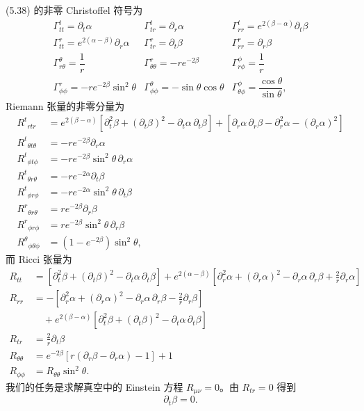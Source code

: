 (5.38) 的非零 Christoffel 符号为
\begin{equation*}
\begin{array}{lll}
\Gamma^t_{tt} = \partial_t\alpha & \Gamma^t_{tr} = \partial_r\alpha & \Gamma^t_{rr} = e^{2(\beta-\alpha)}\partial_t\beta\\[8pt]
\Gamma^r_{tt} = e^{2(\alpha-\beta)}\partial_r\alpha & \Gamma^r_{tr} = \partial_t\beta & \Gamma^r_{rr} = \partial_r\beta\\[8pt]
\Gamma^\theta_{r\theta} = \dfrac{1}{r} & \Gamma^r_{\theta\theta} = -re^{-2\beta} & \Gamma^\phi_{r\phi} = \dfrac{1}{r}\\[8pt]
\Gamma^r_{\phi\phi} = -re^{-2\beta}\sin^2\theta & \Gamma^\theta_{\phi\phi} = -\sin\theta\cos\theta & \Gamma^\phi_{\theta\phi} = \dfrac{\cos\theta}{\sin\theta},
\end{array}
\tag{5.39}
\end{equation*}
Riemann 张量的非零分量为
\begin{align*}
R^t{}_{rtr} &= e^{2(\beta-\alpha)}\left[\partial_t^2\beta + (\partial_t\beta)^2 - \partial_t\alpha\,\partial_t\beta\right] + \left[\partial_r\alpha\,\partial_r\beta - \partial_r^2\alpha - (\partial_r\alpha)^2\right]\\
R^t{}_{\theta t\theta} &= -re^{-2\beta}\partial_r\alpha\\
R^t{}_{\phi t\phi} &= -re^{-2\beta}\sin^2\theta\,\partial_r\alpha\\
R^t{}_{\theta r\theta} &= -re^{-2\alpha}\partial_t\beta\\
R^t{}_{\phi r\phi} &= -re^{-2\alpha}\sin^2\theta\,\partial_t\beta\\
R^r{}_{\theta r\theta} &= re^{-2\beta}\partial_r\beta\\
R^r{}_{\phi r\phi} &= re^{-2\beta}\sin^2\theta\,\partial_r\beta\\
R^\theta{}_{\phi\theta\phi} &= (1 - e^{-2\beta})\sin^2\theta,
\tag{5.40}
\end{align*}
而 Ricci 张量为
\begin{align*}
R_{tt} &= \left[\partial_t^2\beta + (\partial_t\beta)^2 - \partial_t\alpha\,\partial_t\beta\right] + e^{2(\alpha-\beta)}\left[\partial_r^2\alpha + (\partial_r\alpha)^2 - \partial_r\alpha\,\partial_r\beta + \frac{2}{r}\partial_r\alpha\right]\\
R_{rr} &= -\left[\partial_r^2\alpha + (\partial_r\alpha)^2 - \partial_r\alpha\,\partial_r\beta - \frac{2}{r}\partial_r\beta\right]\\
&\quad + e^{2(\beta-\alpha)}\left[\partial_t^2\beta + (\partial_t\beta)^2 - \partial_t\alpha\,\partial_t\beta\right]\\
R_{tr} &= \frac{2}{r}\partial_t\beta\\
R_{\theta\theta} &= e^{-2\beta}\left[r(\partial_r\beta - \partial_r\alpha) - 1\right] + 1\\
R_{\phi\phi} &= R_{\theta\theta}\sin^2\theta.
\tag{5.41}
\end{align*}
我们的任务是求解真空中的 Einstein 方程 $R_{\mu\nu} = 0$。由 $R_{tr} = 0$ 得到
\begin{equation*}
\partial_t\beta = 0.
\tag{5.42}
\end{equation*}

